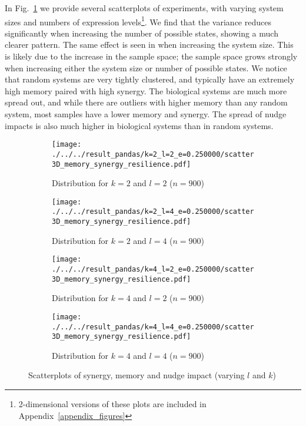 \documentclass[../main.tex]{subfiles}
\begin{document}
In Fig.~\ref{fig:3dscatter} we provide several scatterplots of experiments, with varying system sizes and numbers of expression levels\footnote{2-dimensional versions of these plots are included in Appendix~\ref{appendix_figures}}.
We find that the variance reduces significantly when increasing the number of possible states, showing a much clearer pattern.
The same effect is seen in when increasing the system size.
This is likely due to the increase in the sample space; the sample space grows strongly when increasing either the system size or number of possible states.
We notice that random systems are very tightly clustered, and typically have an extremely high memory paired with high synergy.
The biological systems are much more spread out, and while there are outliers with higher memory than any random system, most samples have a lower memory and synergy.
The spread of nudge impacts is also much higher in biological systems than in random systems.

\begin{figure}[H]
    \centering
    \begin{subfigure}[b]{0.45\textwidth}
        \texttt{[image: ./../../result\_pandas/k=2\_l=2\_e=0.250000/scatter3D\_memory\_synergy\_resilience.pdf]}
        \caption{Distribution for $k=2$ and $l=2$ ($n=900$)}
    \end{subfigure}
    \begin{subfigure}[b]{0.45\textwidth}
        \texttt{[image: ./../../result\_pandas/k=2\_l=4\_e=0.250000/scatter3D\_memory\_synergy\_resilience.pdf]}
        \caption{Distribution for $k=2$ and $l=4$ ($n=900$)}
    \end{subfigure}
\bigskip
    \begin{subfigure}[b]{0.45\textwidth}
        \texttt{[image: ./../../result\_pandas/k=4\_l=2\_e=0.250000/scatter3D\_memory\_synergy\_resilience.pdf]}
        \caption{Distribution for $k=4$ and $l=2$ ($n=900$)}
    \end{subfigure}
    \begin{subfigure}[b]{0.45\textwidth}
        \texttt{[image: ./../../result\_pandas/k=4\_l=4\_e=0.250000/scatter3D\_memory\_synergy\_resilience.pdf]}
        \caption{Distribution for $k=4$ and $l=4$ ($n=900$)}
    \end{subfigure}
    \caption{Scatterplots of synergy, memory and nudge impact (varying $l$ and $k$)}
    \label{fig:3dscatter}
\end{figure}
\end{document}
